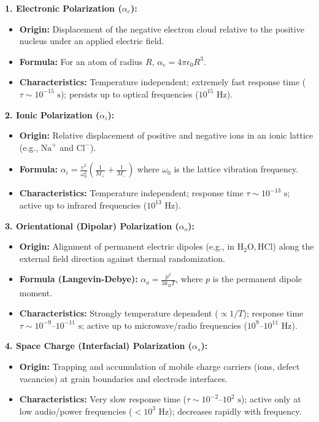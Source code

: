 \begin{theorysol}
\textbf{1. Electronic Polarization ($\alpha_e$):}
\begin{itemize}
\item \textbf{Origin:} Displacement of the negative electron cloud relative to the positive nucleus under an applied electric field.
\item \textbf{Formula:} For an atom of radius $R$, $\alpha_e = 4\pi\epsilon_0 R^3$.
\item \textbf{Characteristics:} Temperature independent; extremely fast response time ($\tau \sim 10^{-15}\text{ s}$); persists up to optical frequencies ($10^{15}\text{ Hz}$).
\end{itemize}

\textbf{2. Ionic Polarization ($\alpha_i$):}
\begin{itemize}
\item \textbf{Origin:} Relative displacement of positive and negative ions in an ionic lattice (e.g., $\text{Na}^+$ and $\text{Cl}^-$).
\item \textbf{Formula:} $\alpha_i = \frac{e^2}{\omega_0^2}\left(\frac{1}{M_+} + \frac{1}{M_-}\right)$ where $\omega_0$ is the lattice vibration frequency.
\item \textbf{Characteristics:} Temperature independent; response time $\tau \sim 10^{-13}\text{ s}$; active up to infrared frequencies ($10^{13}\text{ Hz}$).
\end{itemize}

\textbf{3. Orientational (Dipolar) Polarization ($\alpha_o$):}
\begin{itemize}
\item \textbf{Origin:} Alignment of permanent electric dipoles (e.g., in $\text{H}_2\text{O}, \text{HCl}$) along the external field direction against thermal randomization.
\item \textbf{Formula (Langevin-Debye):} $\alpha_o = \frac{p^2}{3k_B T}$, where $p$ is the permanent dipole moment.
\item \textbf{Characteristics:} Strongly temperature dependent ($\propto 1/T$); response time $\tau \sim 10^{-9}\text{--}10^{-11}\text{ s}$; active up to microwave/radio frequencies ($10^9\text{--}10^{11}\text{ Hz}$).
\end{itemize}

\textbf{4. Space Charge (Interfacial) Polarization ($\alpha_s$):}
\begin{itemize}
\item \textbf{Origin:} Trapping and accumulation of mobile charge carriers (ions, defect vacancies) at grain boundaries and electrode interfaces.
\item \textbf{Characteristics:} Very slow response time ($\tau \sim 10^{-2}\text{--}10^2\text{ s}$); active only at low audio/power frequencies ($<10^3\text{ Hz}$); decreases rapidly with frequency.
\end{itemize}


\end{theorysol}
